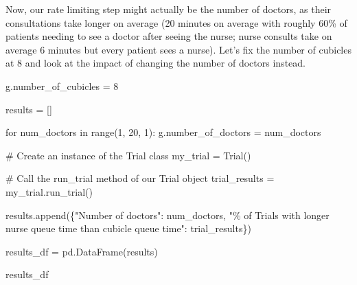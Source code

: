 \documentclass[
  letterpaper,
  DIV=11,
  numbers=noendperiod]{scrreprt}
\newenvironment{Shaded}{}{}
\newcommand{\BuiltInTok}[1]{\textcolor[rgb]{0.84,0.23,0.29}{#1}}
\newcommand{\CommentTok}[1]{\textcolor[rgb]{0.42,0.45,0.49}{#1}}
\newcommand{\ControlFlowTok}[1]{\textcolor[rgb]{0.84,0.23,0.29}{#1}}
\newcommand{\DecValTok}[1]{\textcolor[rgb]{0.00,0.36,0.77}{#1}}
\newcommand{\KeywordTok}[1]{\textcolor[rgb]{0.84,0.23,0.29}{#1}}
\newcommand{\NormalTok}[1]{\textcolor[rgb]{0.14,0.16,0.18}{#1}}
\newcommand{\OperatorTok}[1]{\textcolor[rgb]{0.14,0.16,0.18}{#1}}
\newcommand{\SpecialCharTok}[1]{\textcolor[rgb]{0.00,0.36,0.77}{#1}}
\newcommand{\StringTok}[1]{\textcolor[rgb]{0.01,0.18,0.38}{#1}}
\begin{document}
Now, our rate limiting step might actually be the number of doctors, as
their consultations take longer on average (20 minutes on average with
roughly 60\% of patients needing to see a doctor after seeing the nurse;
nurse consults take on average 6 minutes but every patient sees a
nurse). Let's fix the number of cubicles at 8 and look at the impact of
changing the number of doctors instead.

\begin{Shaded}
\begin{Highlighting}[]
\NormalTok{g.number\_of\_cubicles }\OperatorTok{=} \DecValTok{8}

\NormalTok{results }\OperatorTok{=}\NormalTok{ []}

\ControlFlowTok{for}\NormalTok{ num\_doctors }\KeywordTok{in} \BuiltInTok{range}\NormalTok{(}\DecValTok{1}\NormalTok{, }\DecValTok{20}\NormalTok{, }\DecValTok{1}\NormalTok{):}
\NormalTok{    g.number\_of\_doctors }\OperatorTok{=}\NormalTok{ num\_doctors}

    \CommentTok{\# Create an instance of the Trial class}
\NormalTok{    my\_trial }\OperatorTok{=}\NormalTok{ Trial()}

    \CommentTok{\# Call the run\_trial method of our Trial object}
\NormalTok{    trial\_results }\OperatorTok{=}\NormalTok{ my\_trial.run\_trial()}

\NormalTok{    results.append(\{}\StringTok{"Number of doctors"}\NormalTok{: num\_doctors,}
      \StringTok{"}\SpecialCharTok{\% o}\StringTok{f Trials with longer nurse queue time than cubicle queue time"}\NormalTok{: trial\_results\})}

\NormalTok{results\_df }\OperatorTok{=}\NormalTok{ pd.DataFrame(results)}

\NormalTok{results\_df}
\end{Highlighting}
\end{Shaded}
\end{document}
